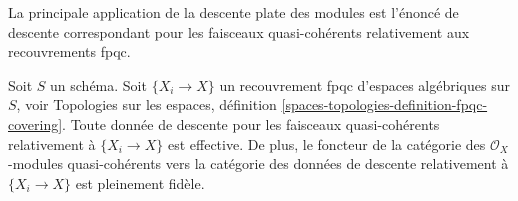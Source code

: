 \noindent
La principale application de la descente plate des modules est
l'énoncé de descente correspondant pour les faisceaux quasi-cohérents
relativement aux recouvrements fpqc.

\begin{proposition}
\label{proposition-fpqc-descent-quasi-coherent}
Soit $S$ un schéma.
Soit $\{X_i \to X\}$ un recouvrement fpqc d'espaces algébriques sur $S$, voir
Topologies sur les espaces,
définition \ref{spaces-topologies-definition-fpqc-covering}.
Toute donnée de descente pour les faisceaux quasi-cohérents
relativement à $\{X_i \to X\}$ est effective.
De plus, le foncteur de la catégorie des
$\mathcal{O}_X$-modules quasi-cohérents vers la catégorie
des données de descente relativement à $\{X_i \to X\}$ est pleinement fidèle.
\end{proposition}

